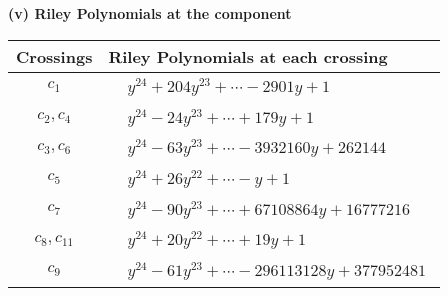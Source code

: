 \documentclass[1p]{elsarticle_modified}
\theoremstyle{definition}
\begin{document}
\newpage\renewcommand{\arraystretch}{1}
\flushleft \textbf{(v) Riley Polynomials at the component}\newline \\
\begin{tabular}{m{50pt}|m{274pt}}
Crossings & \hspace{64pt}Riley Polynomials at each crossing \\
\hline $$\begin{aligned}c_{1}\end{aligned}$$&$\begin{aligned}
&y^{24}+204 y^{23}+\cdots-2901 y+1
\end{aligned}$\\
\hline $$\begin{aligned}c_{2},c_{4}\end{aligned}$$&$\begin{aligned}
&y^{24}-24 y^{23}+\cdots+179 y+1
\end{aligned}$\\
\hline $$\begin{aligned}c_{3},c_{6}\end{aligned}$$&$\begin{aligned}
&y^{24}-63 y^{23}+\cdots-3932160 y+262144
\end{aligned}$\\
\hline $$\begin{aligned}c_{5}\end{aligned}$$&$\begin{aligned}
&y^{24}+26 y^{22}+\cdots- y+1
\end{aligned}$\\
\hline $$\begin{aligned}c_{7}\end{aligned}$$&$\begin{aligned}
&y^{24}-90 y^{23}+\cdots+67108864 y+16777216
\end{aligned}$\\
\hline $$\begin{aligned}c_{8},c_{11}\end{aligned}$$&$\begin{aligned}
&y^{24}+20 y^{22}+\cdots+19 y+1
\end{aligned}$\\
\hline $$\begin{aligned}c_{9}\end{aligned}$$&$\begin{aligned}
&y^{24}-61 y^{23}+\cdots-296113128 y+377952481
\end{aligned}$\\

\end{tabular}
\end{document}
